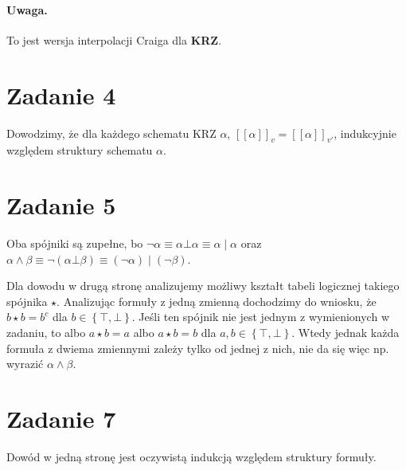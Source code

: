 \paragraph{Uwaga.} To jest wersja interpolacji Craiga dla \textbf{KRZ}.

\section*{Zadanie 4}

Dowodzimy, że dla każdego schematu KRZ \( \alpha \), \( [[\alpha ]]_v = [[\alpha ]]_{v'} \), indukcyjnie względem struktury schematu \( \alpha \).

\section*{Zadanie 5} 

Oba spójniki są zupełne, bo \( \neg \alpha \equiv \alpha \bot \alpha \equiv \alpha \mid \alpha \) oraz \( \alpha \wedge \beta \equiv \neg (\alpha \bot \beta) \equiv (\neg \alpha) \mid (\neg \beta) \).

Dla dowodu w drugą stronę analizujemy możliwy kształt tabeli logicznej takiego spójnika \( \star \). Analizując formuły z jedną zmienną dochodzimy do wniosku, że \( b \star b = b^c \) dla \( b \in \left\{ \top, \bot \right\} \). Jeśli ten spójnik nie jest jednym z wymienionych w zadaniu, to albo \( a \star b = a \) albo \( a \star b = b \) dla \( a, b \in \left\{ \top, \bot \right\} \). Wtedy jednak każda formuła z dwiema zmiennymi zależy tylko od jednej z nich, nie da się więc np. wyrazić \( \alpha \wedge \beta \).

\section*{Zadanie 7}

Dowód w jedną stronę jest oczywistą indukcją względem struktury formuły.

